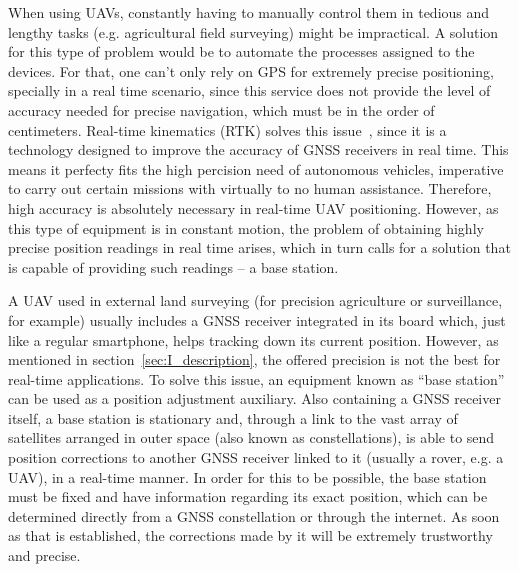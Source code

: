 When using UAVs, constantly having to manually control them in tedious and lengthy tasks (e.g. agricultural field surveying) might be impractical.
A solution for this type of problem would be to automate the processes assigned to the devices. For that, one can't only rely on GPS for extremely precise positioning, specially in a real time scenario, since this service does not provide the level of accuracy needed for precise navigation, which must be in the order of centimeters. Real-time kinematics (RTK) solves this issue~\cite{gps_USGov,8714161},
since it is a technology designed to improve the accuracy of GNSS receivers in real time. This means it perfecty fits the high percision need of autonomous vehicles, imperative to carry out certain missions with virtually to no human assistance. Therefore, high accuracy is absolutely necessary in real-time UAV positioning.
However, as this type of equipment is in constant motion, the problem of obtaining highly precise position readings in real time arises, which in turn calls for a solution that is capable of providing such readings -- a base station.

A UAV used in external land surveying (for precision agriculture or surveillance, for example) usually includes a GNSS receiver integrated in its board which, just like a regular smartphone, helps tracking down its current position.
However, as mentioned in section~\ref{sec:I_description}, the offered precision is not the best for real-time applications.
To solve this issue, an equipment known as ``base station'' can be used as a position adjustment auxiliary.
Also containing a GNSS receiver itself, a base station is stationary and, through a link to the vast array of satellites arranged in outer space (also known as constellations), is able to send position corrections to another GNSS receiver linked to it (usually a rover, e.g. a UAV), in a real-time manner.
In order for this to be possible, the base station must be fixed and have information regarding its exact position, which can be determined directly from a GNSS constellation or through the internet.
As soon as that is established, the corrections made by it will be extremely trustworthy and precise.

